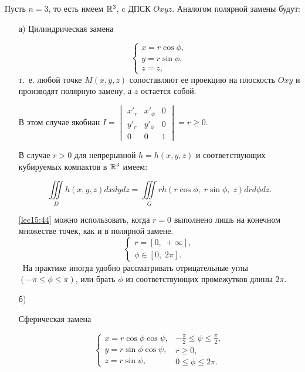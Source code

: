 \documentclass[../../main.tex]{subfiles}
\begin{document}
	\begin{iex}
		Пусть $ n = 3 $, то есть имеем $ \mathbb{R}^3 $, c ДПСК $ Oxyz $. Аналогом полярной 
		замены 
		будут:
		\begin{itemize}
			\item[а)]
			Цилиндрическая замена
			
			\[\begin{cases}
				x = r \cos{\phi},\\
				y = r \sin{\phi},\\
				z = z,
			\end{cases}\]
			т.~е. любой точке $M(x,y,z)$ сопоставляют ее проекцию на плоскость $Oxy$ и 
			производят полярную замену, а $z$ остается собой.
			
			В этом случае якобиан $I = \begin{vmatrix}
			x'_r & x'_\phi & 0 \\
			y'_r & y'_\phi & 0 \\
			0 & 0 & 1
			\end{vmatrix}=r\geq 0$.
			
			В случае $r > 0$ для непрерывной $h=h(x, y, z)$ и соответствующих
			кубируемых компактов в $\mathbb{R}^3$ имеем:
			
			\begin{equation}
			\label{lec15:44}
			\iiint\limits_{D} h(x, y, z) dx dy dz=
			\iiint\limits_{G} rh(r\cos{\phi},\; r\sin{\phi},\; z) dr d\phi dz.
			\end{equation}
			
			\eqref{lec15:44} можно использовать, когда $r=0$ выполнено лишь на конечном 
			множестве  точек, как и в полярной замене.
			\[
			\begin{cases}
			r = [0,\;+\infty], \\ \phi \in [0,\; 2\pi].
			\end{cases}\]\
			На практике иногда удобно рассматривать
			отрицательные углы $(-\pi \leq \phi \leq \pi)$, или брать $\phi$ из
			соответствующих промежутков длины $2\pi$.
			
			\item[б)]
			
			Сферическая замена 
			
			\[\begin{cases}
			x = r \cos{\phi} \cos{\psi},\\
			y = r \sin{\phi} \cos{\psi},\\
			z = r \sin{\psi},
			\end{cases}
			\begin{array}{l}
			 -\frac{\pi}{2}\leq \psi \leq \frac{\pi}{2},\\
			 r \geq 0,\\
			 0 \leq \phi \leq 2\pi.
			\end{array}\]
			

\end{itemize}
\end{iex}
\end{document}
